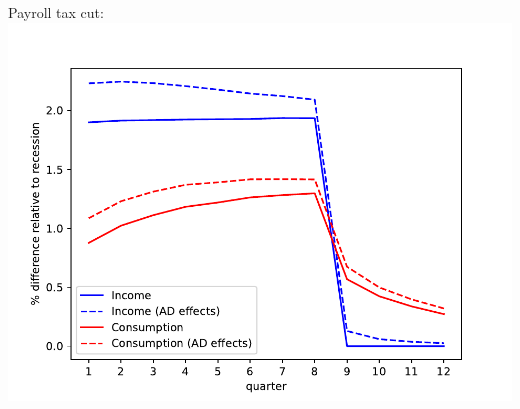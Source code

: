 \documentclass[pdflatex,aspectratio=169]{beamer}
\begin{document}
{\begin{frame}
\begin{columns}
              \begin{column}{0.33\textwidth}  
                \footnotesize Payroll tax cut:	
                \includegraphics[width=1.2\linewidth]{Code/HA-Models/FromPandemicCode/Figures/recession_taxcut_relrecession}
              \end{column}
            \end{columns}

          \end{frame}
        }{}
\end{document}
